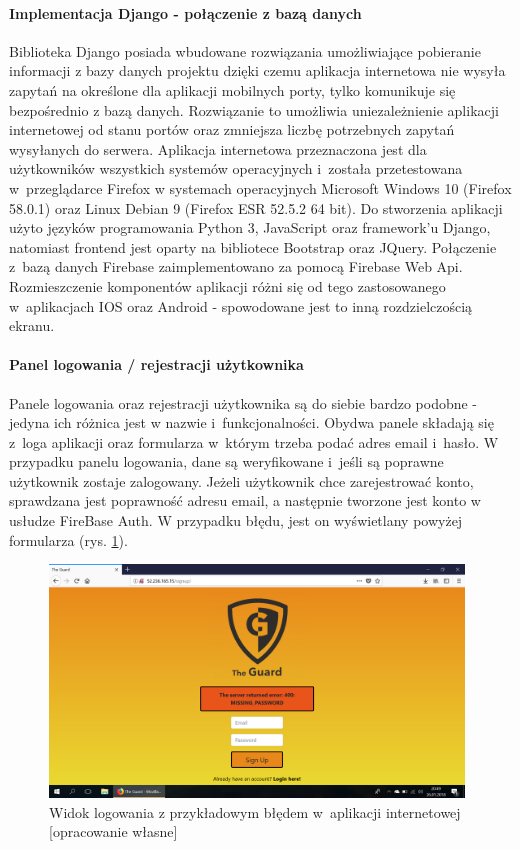 \documentclass[polish,bachelor,a4paper,oneside]{ppfcmthesis}
\begin{document}
    \paragraph{Implementacja Django - połączenie z bazą danych}
    Biblioteka Django posiada wbudowane rozwiązania umożliwiające pobieranie informacji z bazy danych projektu dzięki czemu aplikacja internetowa nie wysyła zapytań na określone dla aplikacji mobilnych porty, tylko komunikuje się bezpośrednio z bazą danych. Rozwiązanie to umożliwia uniezależnienie aplikacji internetowej od stanu portów oraz zmniejsza liczbę potrzebnych zapytań wysyłanych do serwera.
    Aplikacja internetowa przeznaczona jest dla użytkowników wszystkich systemów operacyjnych i~została przetestowana w~przeglądarce Firefox w systemach operacyjnych Microsoft Windows 10 (Firefox 58.0.1) oraz Linux Debian 9 (Firefox ESR 52.5.2 64 bit). Do stworzenia aplikacji użyto języków programowania Python 3, JavaScript oraz framework'u Django, natomiast frontend jest oparty na bibliotece Bootstrap oraz JQuery. Połączenie z~bazą danych Firebase zaimplementowano za pomocą Firebase Web Api. Rozmieszczenie komponentów aplikacji różni się od tego zastosowanego w~aplikacjach IOS oraz Android - spowodowane jest to inną rozdzielczością ekranu.

    \paragraph{Panel logowania / rejestracji użytkownika} Panele logowania oraz rejestracji użytkownika są do siebie bardzo podobne - jedyna ich różnica jest w nazwie i~funkcjonalności. Obydwa panele składają się z~loga aplikacji oraz formularza w~którym trzeba podać adres email i~hasło. W przypadku panelu logowania, dane są weryfikowane i~jeśli są poprawne użytkownik zostaje zalogowany. Jeżeli użytkownik chce zarejestrować konto, sprawdzana jest poprawność adresu email, a następnie tworzone jest konto w usłudze FireBase Auth. W przypadku błędu, jest on wyświetlany powyżej formularza (rys. \ref{web_login_err}).
    \begin{figure}[H]
        \centering
        \includegraphics[width=11cm]{web_screenshots/error.png}
        \caption{Widok logowania z przykładowym błędem w~aplikacji internetowej [opracowanie własne]}
        \label{web_login_err}
    \end{figure}
\end{document}
